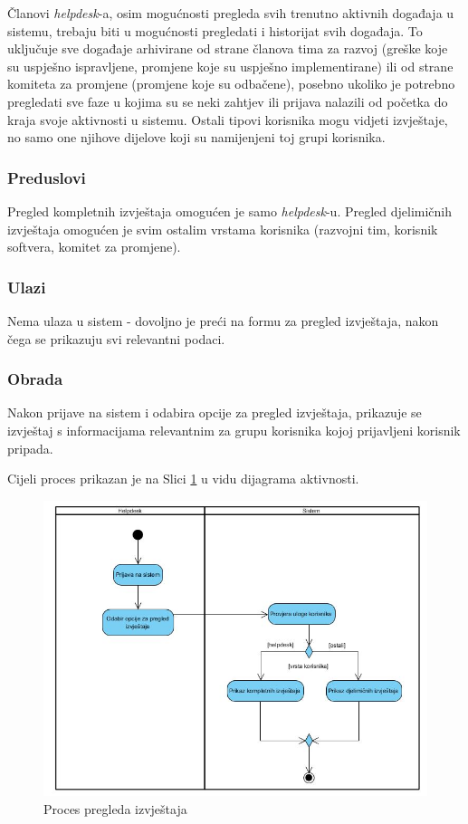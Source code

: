 \documentclass[12pt,a4paper]{article}
\begin{document}
Članovi \textit{helpdesk}-a, osim mogućnosti pregleda svih trenutno aktivnih događaja u sistemu, trebaju biti u mogućnosti pregledati i historijat svih događaja. To uključuje sve događaje arhivirane od strane članova tima za razvoj (greške koje su uspješno ispravljene, promjene koje su uspješno implementirane) ili od strane komiteta za promjene (promjene koje su odbačene), posebno ukoliko je potrebno pregledati sve faze u kojima su se neki zahtjev ili prijava nalazili od početka do kraja svoje aktivnosti u sistemu. Ostali tipovi korisnika mogu vidjeti izvještaje, no  samo one njihove dijelove koji su namijenjeni toj grupi korisnika.

\subsubsection{Preduslovi}

Pregled kompletnih izvještaja omogućen je samo \textit{helpdesk}-u. Pregled djelimičnih izvještaja omogućen je svim ostalim vrstama korisnika (razvojni tim, korisnik softvera, komitet za promjene).

\subsubsection{Ulazi}

Nema ulaza u sistem - dovoljno je preći na formu za pregled izvještaja, nakon čega se prikazuju svi relevantni podaci.

\subsubsection{Obrada}

Nakon prijave na sistem i odabira opcije za pregled izvještaja, prikazuje se izvještaj s informacijama relevantnim za grupu korisnika kojoj prijavljeni korisnik pripada.

Cijeli proces prikazan je na Slici \ref{act12} u vidu dijagrama aktivnosti.

\begin{figure}[H]
\center
\includegraphics[scale=0.5]{../res/Activity/activity12.JPG}
\caption{Proces pregleda izvještaja}
\label{act12}
\end{figure}
\end{document}

